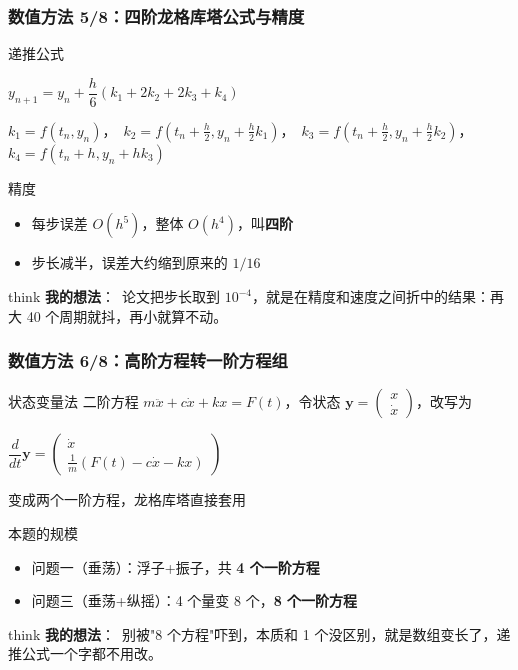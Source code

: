 \documentclass[aspectratio=169]{beamer}
\newcommand{\remark}[2]{%
	\vspace{0.12cm}%
	\begin{beamercolorbox}[rounded=true,sep=6pt]{think}%
		{\color{orchidpurple}\textbf{#1}：}~#2%
	\end{beamercolorbox}%
}
\begin{document}
\begin{frame}
	\frametitle{数值方法 5/8：四阶龙格库塔公式与精度}
	\scriptsize
	\begin{block}{递推公式}
		\begin{center}
			$y_{n+1}=y_n+\dfrac{h}{6}(k_1+2k_2+2k_3+k_4)$
		\end{center}
		$k_1=f(t_n,y_n)$，\ $k_2=f(t_n+\frac{h}{2},y_n+\frac{h}{2}k_1)$，\ $k_3=f(t_n+\frac{h}{2},y_n+\frac{h}{2}k_2)$，\ $k_4=f(t_n+h,y_n+h k_3)$
	\end{block}
	\begin{block}{精度}
		\begin{itemize}
			\item 每步误差 $O(h^5)$，整体 $O(h^4)$，叫\textbf{四阶}
			\item 步长减半，误差大约缩到原来的 $1/16$
		\end{itemize}
	\end{block}
	\remark{我的想法}{论文把步长取到 $10^{-4}$，就是在精度和速度之间折中的结果：再大 40 个周期就抖，再小就算不动。}
\end{frame}

\begin{frame}
	\frametitle{数值方法 6/8：高阶方程转一阶方程组}
	\scriptsize
	\begin{block}{状态变量法}
		二阶方程 $m\ddot x+c\dot x+kx=F(t)$，令状态 $\bm y=\begin{pmatrix}x\\ \dot x\end{pmatrix}$，改写为
		\begin{center}
			$\dfrac{d}{dt}\bm y=\begin{pmatrix}\dot x\\ \frac{1}{m}(F(t)-c\dot x-kx)\end{pmatrix}$
		\end{center}
		变成两个一阶方程，龙格库塔直接套用
	\end{block}
	\begin{block}{本题的规模}
		\begin{itemize}
			\item 问题一（垂荡）：浮子+振子，共 \textbf{4 个一阶方程}
			\item 问题三（垂荡+纵摇）：4 个量变 8 个，\textbf{8 个一阶方程}
		\end{itemize}
	\end{block}
	\remark{我的想法}{别被"8 个方程"吓到，本质和 1 个没区别，就是数组变长了，递推公式一个字都不用改。}
\end{frame}
\end{document}
